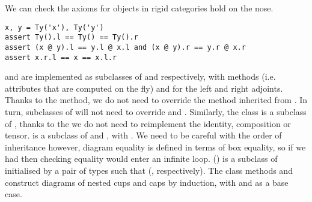 \begin{example}
We can check the axioms for objects in rigid categories hold on the nose.

\begin{verbatim}
x, y = Ty('x'), Ty('y')
assert Ty().l == Ty() == Ty().r
assert (x @ y).l == y.l @ x.l and (x @ y).r == y.r @ x.r
assert x.r.l == x == x.l.r
\end{verbatim}
\end{example}

 and  are implemented as subclasses of  and  respectively, with  methods (i.e. attributes that are computed on the fly)  and  for the left and right adjoints.
Thanks to the  method, we do not need to override the  method inherited from .
In turn, subclasses of  will not need to override  and .
Similarly, the  class is a subclass of , thanks to the  we do not need to reimplement the identity, composition or tensor.
 is a subclass of  and , with .
We need to be careful with the order of inheritance however, diagram equality is defined in terms of box equality, so if we had  then checking equality would enter an infinite loop.
 () is a subclass of  initialised by a pair of types  such that   (, respectively).
The class methods  and  construct diagrams of nested cups and caps by induction, with  and  as a base case.

